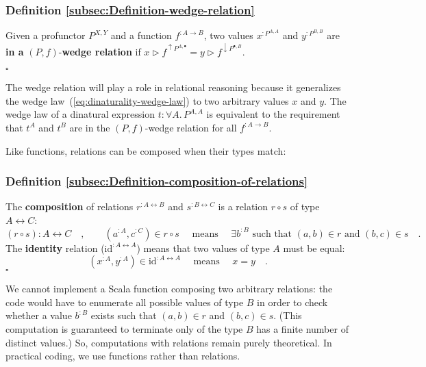 \subsubsection{Definition \label{subsec:Definition-wedge-relation}\ref{subsec:Definition-wedge-relation}}

Given a profunctor $P^{X,Y}$ and
a function $f^{:A\rightarrow B}$, two values $x^{:P^{A,A}}$ and
$y^{:P^{B,B}}$ are \textbf{in a} $\left(P,f\right)$-\textbf{wedge
relation} if $x\triangleright f^{\uparrow P^{A,\bullet}}=y\triangleright f^{\downarrow P^{\bullet,B}}$.

$\square$

The wedge relation will play a role in relational reasoning because
it generalizes the wedge law~(\ref{eq:dinaturality-wedge-law}) to
two arbitrary values $x$ and $y$. The wedge law of a dinatural expression
$t:\forall A.\,P^{A,A}$ is equivalent to the requirement that $t^{A}$
and $t^{B}$ are in the $\left(P,f\right)$-wedge relation for all
$f^{:A\rightarrow B}$.

Like functions, relations can be composed when their types match: 

\subsubsection{Definition \label{subsec:Definition-composition-of-relations}\ref{subsec:Definition-composition-of-relations}}

The \textbf{composition} of relations $r^{:A\leftrightarrow B}$ and
$s^{:B\leftrightarrow C}$ is a relation $r\circ s$ of type $A\leftrightarrow C$:
\[
(r\circ s):A\leftrightarrow C\quad,\quad\quad(a^{:A},c^{:C})\in r\circ s\quad\text{ means }\quad\exists b^{:B}\text{ such that }(a,b)\in r\text{ and }(b,c)\in s\quad.
\]
The \textbf{identity} relation ($\text{id}^{:A\leftrightarrow A}$)
means that two values of type $A$ must be equal:
\[
(x^{:A},y^{:A})\in\text{id}^{:A\leftrightarrow A}\quad\text{ means }\quad x=y\quad.
\]
$\square$

We cannot implement a Scala function composing two arbitrary relations:
the code would have to enumerate all possible values of type $B$
in order to check whether a value $b^{:B}$ exists such that $(a,b)\in r$
and $(b,c)\in s$. (This computation is guaranteed to terminate only
of the type $B$ has a finite number of distinct values.) So, computations
with relations remain purely theoretical. In practical coding, we
use functions rather than relations.

